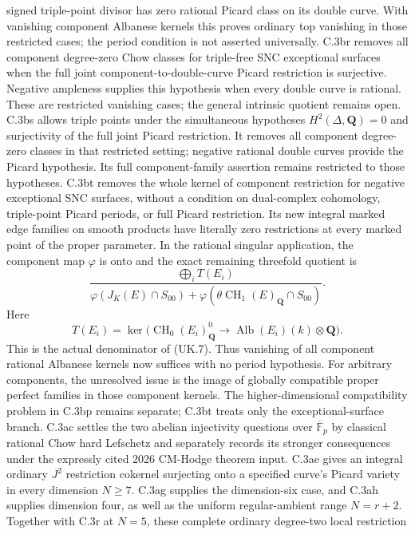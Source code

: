 signed triple-point divisor has zero rational Picard class on its double
curve. With vanishing component Albanese kernels this proves ordinary
top vanishing in those restricted cases; the period condition is not
asserted universally.
C.3br removes all component degree-zero Chow classes for triple-free
SNC exceptional surfaces when the full joint component-to-double-curve
Picard restriction is surjective. Negative ampleness supplies this
hypothesis when every double curve is rational. These are restricted
vanishing cases; the general intrinsic quotient remains open.
C.3bs allows triple points under the simultaneous hypotheses
$H^2(\Delta,\mathbf Q)=0$ and surjectivity of the full joint Picard
restriction. It removes all component degree-zero classes in that
restricted setting; negative rational double curves provide the Picard
hypothesis. Its full component-family assertion remains restricted to
those hypotheses.
C.3bt removes the whole kernel of component restriction for negative
exceptional SNC surfaces, without a condition on dual-complex cohomology,
triple-point Picard periods, or full Picard restriction. Its new integral
marked edge families on smooth products have literally zero restrictions
at every marked point of the proper parameter. In the rational singular
application, the component map $\varphi$ is onto and the exact remaining
threefold quotient is
\[
 \frac{\displaystyle\bigoplus_i T(E_i)}
 {\varphi(J_K(E)\cap S_{00})+
  \varphi(\theta\operatorname{CH}_1(E)_{\mathbf Q}\cap S_{00})}.
\]
Here
\[
 T(E_i)=\ker\bigl(\operatorname{CH}_0(E_i)^0_{\mathbf Q}
          \longrightarrow\operatorname{Alb}(E_i)(k)\otimes\mathbf Q\bigr).
\]
This is the actual denominator of (UK.7). Thus vanishing of all component
rational Albanese kernels now suffices with no period hypothesis.
For arbitrary components, the unresolved issue is the image of globally
compatible proper perfect families in those component kernels. The
higher-dimensional compatibility problem in C.3bp remains separate;
C.3bt treats only the exceptional-surface branch.
C.3ac settles the two abelian
injectivity questions over $\overline{\mathbb F}_p$ by
classical rational Chow hard Lefschetz and separately
records its stronger consequences under the expressly
cited 2026 CM-Hodge theorem input.
C.3ae gives an integral ordinary $J^2$ restriction cokernel
surjecting onto a specified curve's Picard variety in every
dimension $N\ge7$. C.3ag supplies the dimension-six case,
and C.3ah supplies dimension four, as well as the uniform
regular-ambient range $N=r+2$. Together with C.3r at $N=5$,
these complete ordinary degree-two local restriction

